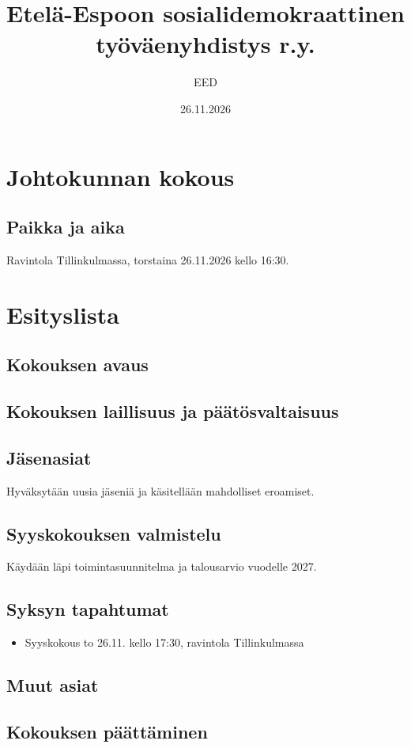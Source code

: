 \documentclass[a4paper,12pt]{article}
\title{Etelä-Espoon sosialidemokraattinen työväenyhdistys r.y.}
\author{EED}
\date{26.11.2026}
\begin{document}
\maketitle
\tableofcontents
\section*{Johtokunnan kokous}
\subsection*{Paikka ja aika}
Ravintola Tillinkulmassa, torstaina 26.11.2026 kello 16:30.
\section*{Esityslista}
\subsection{Kokouksen avaus}
\subsection{Kokouksen laillisuus ja päätösvaltaisuus}
\subsection{Jäsenasiat}
Hyväksytään uusia jäseniä ja käsitellään mahdolliset eroamiset.
\subsection{Syyskokouksen valmistelu}
Käydään läpi toimintasuunnitelma ja talousarvio vuodelle 2027.
\subsection{Syksyn tapahtumat}
\begin{itemize}
\item{Syyskokous} to 26.11. kello 17:30, ravintola Tillinkulmassa
\end{itemize}
\subsection{Muut asiat}
\subsection{Kokouksen päättäminen}
\end{document}

